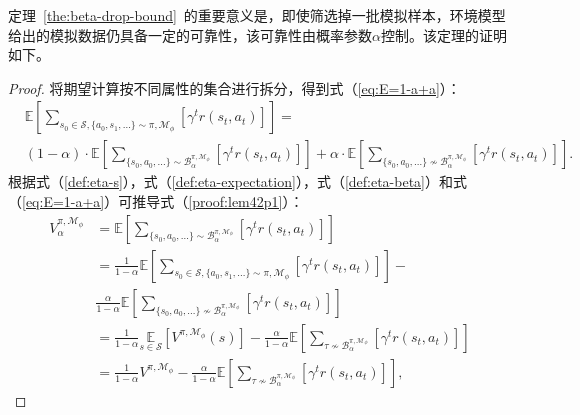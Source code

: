 定理~\ref{the:beta-drop-bound}~的重要意义是，即使筛选掉一批模拟样本，环境模型给出的模拟数据仍具备一定的可靠性，该可靠性由概率参数$\alpha$控制。该定理的证明如下。

\begin{proof}
将期望计算按不同属性的集合进行拆分，得到式（\ref{eq:E=1-a+a}）：
\begin{equation}
\begin{aligned}
    &\mathbb{E}\left[{\sum}_{s_0\in\mathcal{S},\{a_0,s_1,\ldots\} \sim\pi,\mathcal{M}_\phi}\left[\gamma^t r(s_t,a_t)\right]\right] =\\
    &(1-\alpha)\cdot \mathbb{E}\left[{\sum}_{\{s_0,a_0,\ldots\} \sim\mathcal{B}_\alpha^{\pi,\mathcal{M}_\phi}}\left[\gamma^t r(s_t,a_t)\right]\right]+\alpha\cdot\mathbb{E}\left[{\sum}_{\{s_0,a_0,\ldots\} \not\sim\mathcal{B}_\alpha^{\pi,\mathcal{M}_\phi}}\left[\gamma^t r(s_t,a_t)\right]\right].
\end{aligned}\label{eq:E=1-a+a}
\end{equation}
根据式（\ref{def:eta-s}），式（\ref{def:eta-expectation}），式（\ref{def:eta-beta}）和式（\ref{eq:E=1-a+a}）可推导式（\ref{proof:lem42p1}）：
\begin{equation}
\begin{aligned}
{V}^{\pi,\mathcal{M}_\phi}_\alpha&=\mathbb{E}\left[{\sum}_{\{s_0,a_0,\ldots\} \sim\mathcal{B}_\alpha^{\pi,\mathcal{M}_\phi}}\left[\gamma^t r(s_t,a_t)\right]\right]\\
&=\frac{1}{1-\alpha}\mathbb{E}\left[{\sum}_{s_0\in\mathcal{S},\{a_0,s_1,\ldots\} \sim\pi,\mathcal{M}_\phi}\left[\gamma^t r(s_t,a_t)\right]\right]-\\
&\frac{\alpha}{1-\alpha}\mathbb{E}\left[{\sum}_{\{s_0,a_0,\ldots\} \not\sim\mathcal{B}_\alpha^{\pi,\mathcal{M}_\phi}}\left[\gamma^t r(s_t,a_t)\right]\right]\\
&=\frac{1}{1-\alpha}\underset{s\in{\mathcal{S}}}{\mathbb{E}}\left[{V}^{\pi,\mathcal{M}_\phi}(s)\right]-\frac{\alpha}{1-\alpha}\mathbb{E}\left[{\sum}_{\tau \not\sim\mathcal{B}_\alpha^{\pi,\mathcal{M}_\phi}}\left[\gamma^t r(s_t,a_t)\right]\right]\\
&=\frac{1}{1-\alpha}{V}^{\pi,\mathcal{M}_\phi}-\frac{\alpha}{1-\alpha}\mathbb{E}\left[{\sum}_{\tau \not\sim\mathcal{B}_\alpha^{\pi,\mathcal{M}_\phi}}\left[\gamma^t r(s_t,a_t)\right]\right],\label{proof:lem42p1}

\end{aligned}
\end{equation}
\end{proof}
